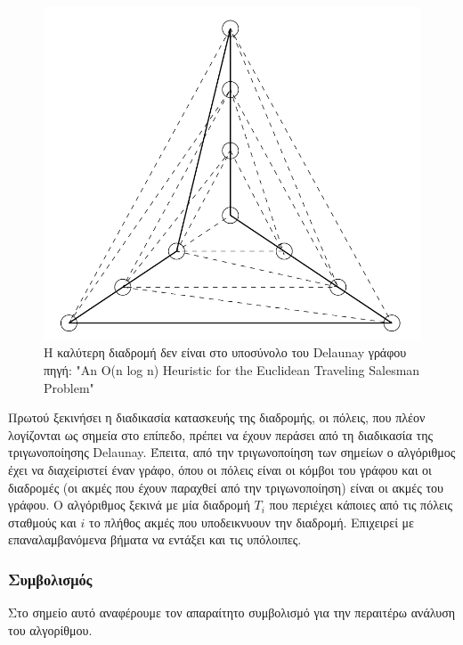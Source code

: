 \documentclass[oneside,12pt]{book}
\newenvironment{matlab}
	{\begin{figure}[hp]\centering\captionsetup{justification=centering}}
	{\end{figure}}
\theoremstyle{definition}
\begin{document}
\begin{matlab}
	\includegraphics[scale=0.5]{images/delaunay_optimum_tour.png}
	\caption{Η καλύτερη διαδρομή δεν είναι στο υποσύνολο του Delaunay γράφου \\ πηγή: "An O(n log n) Heuristic for the Euclidean Traveling Salesman Problem" \cite{10} }
\end{matlab} 

Πρωτού ξεκινήσει η διαδικασία κατασκευής της διαδρομής, οι πόλεις, που πλέον λογίζονται ως σημεία στο επίπεδο, πρέπει να έχουν περάσει από τη διαδικασία της τριγωνοποίησης Delaunay. Έπειτα, από την τριγωνοποίηση των σημείων ο αλγόριθμος έχει να διαχείριστεί έναν γράφο, όπου οι πόλεις είναι οι κόμβοι του γράφου και οι διαδρομές (οι ακμές που έχουν παραχθεί από την τριγωνοποίηση) είναι οι ακμές του γράφου. Ο αλγόριθμος ξεκινά με μία διαδρομή \(T_i\) που περιέχει κάποιες από τις πόλεις σταθμούς και \(i\) το πλήθος ακμές που υποδεικνυουν την διαδρομή. Επιχειρεί με επαναλαμβανόμενα βήματα να εντάξει και τις υπόλοιπες. \\

\subsubsection{Συμβολισμός}

Στο σημείο αυτό αναφέρουμε τον απαραίτητο συμβολισμό για την περαιτέρω ανάλυση του αλγορίθμου. \\
\end{document}
